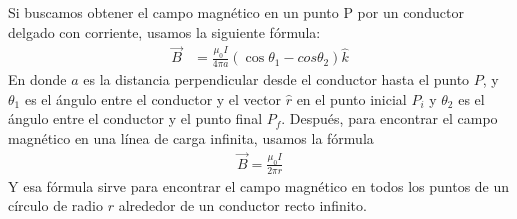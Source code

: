 \documentclass[12pt, letterpaper]{report}
\begin{document}
Si buscamos obtener el campo magnético en un punto P por un conductor delgado con corriente, usamos la siguiente fórmula: 
\begin{align}
\vec{B} &= \frac{\mu_0 I}{4\pi a}(\cos{\theta_1} - cos{\theta_2}) \hat{k}
\label{eq:eq5}
\end{align}
En donde $a$ es la distancia perpendicular desde el conductor hasta el punto $P$, y $\theta_1$ es el ángulo entre el conductor y el vector $\hat{r}$ en el punto 
inicial $P_i$ y $\theta_2$ es el ángulo entre el conductor y el punto final $P_f$.
Después, para encontrar el campo magnético en una línea de carga infinita, usamos la fórmula 
\begin{align}
\vec{B} = \frac{\mu_0 I}{2\pi r}
\label{eq:eq6}
\end{align}
Y esa fórmula sirve para encontrar el campo magnético en todos los puntos de un círculo de radio $r$ alrededor de un conductor 
recto infinito. 
\end{document}

